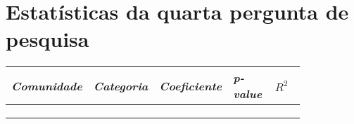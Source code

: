 \chapter{Estatísticas da quarta pergunta de pesquisa}
\label{app:q4}

\small
\begin{longtabu}{@{}
	p{0.2\linewidth}
	p{0.2\linewidth}
	P{0.15\linewidth}
	P{0.15\linewidth}
	P{0.13\linewidth}@{}}
\toprule
\textit{Comunidade}        & \textit{Categoria}    & \textit{Coeficiente} & \textit{p-value} & $R^2$ \\ \midrule
\endhead

\\ \hline
\endfoot

\\
\endlastfoot


\end{longtabu}
